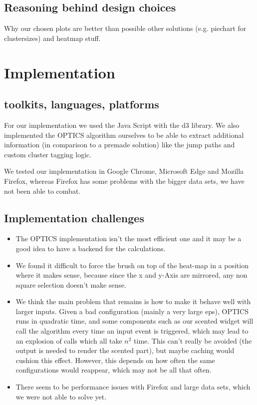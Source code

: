 \documentclass{vgtc}                          %
\begin{document}
\subsection{Reasoning behind design choices}

Why our chosen plots are better than possible other solutions (e.g. piechart for clustersizes) and heatmap stuff.

\section{Implementation} %

\subsection{toolkits, languages, platforms}
\begin{flushleft}
For our implementation we used the Java Script with the d3 library. We also implemented the OPTICS algorithm ourselves to be able to extract additional information (in comparison to a premade solution) like the jump paths and custom cluster tagging logic.
\end{flushleft}
\begin{flushleft}
We tested our implementation in Google Chrome, Microsoft Edge and Mozilla Firefox, whereas Firefox has some problems with the bigger data sets, we have not been able to combat.
\end{flushleft}

\subsection{Implementation challenges}
\begin{itemize}
\item The OPTICS implementation isn't the most efficient one and it may be a good idea to have a backend for the calculations.
\item We found it difficult to force the brush on top of the heat-map in a position where it makes sense, because since the x and y-Axis are mirrored, any non square selection doesn't make sense.
\item We think the main problem that remains is how to make it behave well with larger inputs. Given a bad configuration (mainly a very large eps), OPTICS runs in quadratic time, and some components such as our scented widget will call the algorithm every time an input event is triggered, which may lead to an explosion of calls which all take $ n^{2} $ time. This can't really be avoided (the output is needed to render the scented part), but maybe caching would cushion this effect. However, this depends on how often the same configurations would reappear, which may not be all that often.
\item There seem to be performance issues with Firefox and large data sets, which we were not able to solve yet.
\end{itemize}
\end{document}

